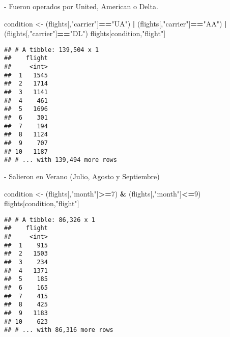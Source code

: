\documentclass[ignorenonframetext,]{beamer}
\newenvironment{Shaded}{\begin{snugshade}}{\end{snugshade}}
\newcommand{\DecValTok}[1]{\textcolor[rgb]{0.00,0.00,0.81}{#1}}
\newcommand{\NormalTok}[1]{#1}
\newcommand{\OperatorTok}[1]{\textcolor[rgb]{0.81,0.36,0.00}{\textbf{#1}}}
\newcommand{\StringTok}[1]{\textcolor[rgb]{0.31,0.60,0.02}{#1}}
\begin{document}
\begin{frame}[fragile]

\begin{block}{- Fueron operados por United, American o Delta.}

\begin{Shaded}
\begin{Highlighting}[]
\NormalTok{condition <-}
\StringTok{  }\NormalTok{(flights[,}\StringTok{"carrier"}\NormalTok{]}\OperatorTok{==}\StringTok{"UA"}\NormalTok{) }\OperatorTok{|}\StringTok{ }
\StringTok{  }\NormalTok{(flights[,}\StringTok{"carrier"}\NormalTok{]}\OperatorTok{==}\StringTok{"AA"}\NormalTok{) }\OperatorTok{|}\StringTok{ }
\StringTok{  }\NormalTok{(flights[,}\StringTok{"carrier"}\NormalTok{]}\OperatorTok{==}\StringTok{"DL"}\NormalTok{)}
\NormalTok{flights[condition,}\StringTok{"flight"}\NormalTok{]}
\end{Highlighting}
\end{Shaded}

\begin{verbatim}
## # A tibble: 139,504 x 1
##    flight
##     <int>
##  1   1545
##  2   1714
##  3   1141
##  4    461
##  5   1696
##  6    301
##  7    194
##  8   1124
##  9    707
## 10   1187
## # ... with 139,494 more rows
\end{verbatim}

\end{block}

\end{frame}

\begin{frame}[fragile]

\begin{block}{- Salieron en Verano (Julio, Agosto y Septiembre)}

\begin{Shaded}
\begin{Highlighting}[]
\NormalTok{condition <-}
\StringTok{  }\NormalTok{(flights[,}\StringTok{"month"}\NormalTok{]}\OperatorTok{>=}\DecValTok{7}\NormalTok{) }\OperatorTok{&}\StringTok{ }
\StringTok{  }\NormalTok{(flights[,}\StringTok{"month"}\NormalTok{]}\OperatorTok{<=}\DecValTok{9}\NormalTok{)}
\NormalTok{flights[condition,}\StringTok{"flight"}\NormalTok{]}
\end{Highlighting}
\end{Shaded}

\begin{verbatim}
## # A tibble: 86,326 x 1
##    flight
##     <int>
##  1    915
##  2   1503
##  3    234
##  4   1371
##  5    185
##  6    165
##  7    415
##  8    425
##  9   1183
## 10    623
## # ... with 86,316 more rows
\end{verbatim}

\end{block}

\end{frame}
\end{document}

